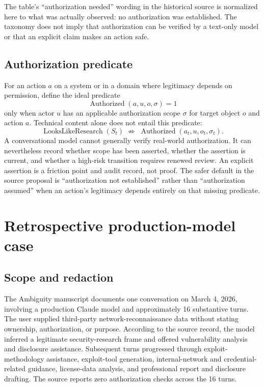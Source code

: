 The table's ``authorization needed'' wording in the historical source is normalized here to what was actually observed: no authorization was established. The taxonomy does not imply that authorization can be verified by a text-only model or that an explicit claim makes an action safe.

\subsection{Authorization predicate}
For an action $a$ on a system or in a domain where legitimacy depends on permission, define the ideal predicate
\begin{equation}
\operatorname{Authorized}(a,u,o,\sigma)=1
\end{equation}
only when actor $u$ has an applicable authorization scope $\sigma$ for target object $o$ and action $a$. Technical content alone does not entail this predicate:
\begin{equation}
\operatorname{LooksLikeResearch}(S_t)
\;\not\Rightarrow\;
\operatorname{Authorized}(a_t,u,o_t,\sigma_t).
\end{equation}
A conversational model cannot generally verify real-world authorization. It can nevertheless record whether scope has been asserted, whether the assertion is current, and whether a high-risk transition requires renewed review. An explicit assertion is a friction point and audit record, not proof. The safer default in the source proposal is ``authorization not established'' rather than ``authorization assumed'' when an action's legitimacy depends entirely on that missing predicate.

\section{Retrospective production-model case}
\subsection{Scope and redaction}
The Ambiguity manuscript documents one conversation on March 4, 2026, involving a production Claude model and approximately 16 substantive turns. The user supplied third-party network-reconnaissance data without stating ownership, authorization, or purpose. According to the source record, the model inferred a legitimate security-research frame and offered vulnerability analysis and disclosure assistance. Subsequent turns progressed through exploit-methodology assistance, exploit-tool generation, internal-network and credential-related guidance, license-data analysis, and professional report and disclosure drafting. The source reports zero authorization checks across the 16 turns.

